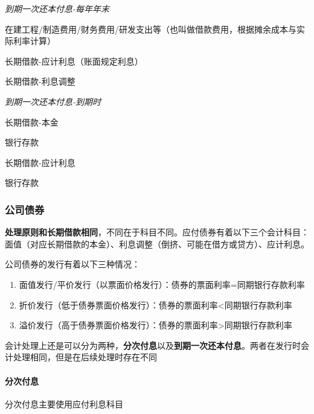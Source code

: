 \documentclass[UTF8,12pt]{ctexart}
\newenvironment{Dr}{%
	\begin{list}{}%
		{
			\setlength{\leftmargin}{2em}
			\setlength{\labelwidth}{2em}
			\setlength{\labelsep}{0pt}
			\setlength{\itemindent}{0pt}
			\setlength{\listparindent}{0pt}
			\setlength{\parsep}{0pt}
			\setlength{\topsep}{0pt}
		}
		\item[\textbf{借：}]
	}{%
	\end{list}
}
\newenvironment{Cr}{%
	\begin{list}{}%
		{
			\setlength{\leftmargin}{3em}
			\setlength{\labelwidth}{2em}
			\setlength{\labelsep}{0pt}
			\setlength{\itemindent}{0pt}
			\setlength{\listparindent}{0pt}
			\setlength{\parsep}{0pt}
			\setlength{\topsep}{0pt}
		}
		\item[\textbf{贷：}]
	}{%
	\end{list}
}
\numberwithin{equation}{section} %
\numberwithin{figure}{section}
\numberwithin{table}{section}
\begin{document}
	\textit{到期一次还本付息-每年年末}
	
	\begin{Dr}
		在建工程/制造费用/财务费用/研发支出等（也叫做借款费用，根据摊余成本与实际利率计算）
	\end{Dr}
	\begin{Cr}
		长期借款-应计利息（账面规定利息）
		
		长期借款-利息调整
	\end{Cr}

	\textit{到期一次还本付息-到期时}
	
	\begin{Dr}
		长期借款-本金
	\end{Dr}
	\begin{Cr}
		银行存款
	\end{Cr}

	\begin{Dr}
		长期借款-应计利息
	\end{Dr}
	\begin{Cr}
		银行存款
	\end{Cr}
	
	\subsubsection{公司债券}
	\textbf{处理原则和长期借款相同}，不同在于科目不同。应付债券有着以下三个会计科目：面值（对应长期借款的本金）、利息调整（倒挤、可能在借方或贷方）、应计利息。
	
	公司债券的发行有着以下三种情况：
	
	\begin{enumerate}
		\item 面值发行/平价发行（以票面价格发行）：债券的票面利率=同期银行存款利率
		
		\item 折价发行（低于债券票面价格发行）：债券的票面利率<同期银行存款利率
		
		\item 溢价发行（高于债券票面价格发行）：债券的票面利率>同期银行存款利率
	\end{enumerate}

	会计处理上还是可以分为两种，\textbf{分次付息}以及\textbf{到期一次还本付息}。两者在发行时会计处理相同，但是在后续处理时存在不同
	
	\paragraph{分次付息} 分次付息主要使用应付利息科目
	
\end{document}
